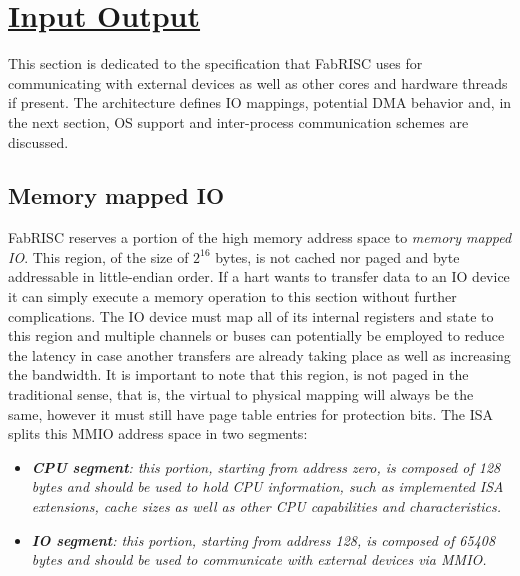 \section[Input Output]{\LARGE\underline{Input Output}}

    \vspace{10pt}

    This section is dedicated to the specification that FabRISC uses for communicating with external devices as well as other cores and hardware threads if present. The architecture defines IO mappings, potential DMA behavior and, in the next section, OS support and inter-process communication schemes are discussed.

    \subsection{Memory mapped IO}

        \vspace{10pt}

        FabRISC reserves a portion of the high memory address space to \textit{memory mapped IO}. This region, of the size of $2^{16}$ bytes, is not cached nor paged and byte addressable in little-endian order. If a hart wants to transfer data to an IO device it can simply execute a memory operation to this section without further complications. The IO device must map all of its internal registers and state to this region and multiple channels or buses can potentially be employed to reduce the latency in case another transfers are already taking place as well as increasing the bandwidth. It is important to note that this region, is not paged in the traditional sense, that is, the virtual to physical mapping will always be the same, however it must still have page table entries for protection bits. The ISA splits this MMIO address space in two segments:

        \begin{itemize}

            \item \textit{\textbf{CPU segment}: this portion, starting from address zero, is composed of 128 bytes and should be used to hold CPU information, such as implemented ISA extensions, cache sizes as well as other CPU capabilities and characteristics.}

            \item \textit{\textbf{IO segment}: this portion, starting from address 128, is composed of 65408 bytes and should be used to communicate with external devices via MMIO.}

        \end{itemize}

